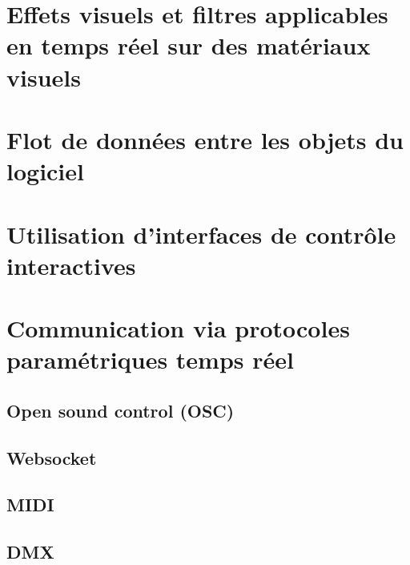 \documentclass[
]{book}
\begin{document}
\hypertarget{effets-visuels-et-filtres-applicables-en-temps-ruxe9el-sur-des-matuxe9riaux-visuels}{%
\section{Effets visuels et filtres applicables en temps réel sur des matériaux visuels}\label{effets-visuels-et-filtres-applicables-en-temps-ruxe9el-sur-des-matuxe9riaux-visuels}}

\hypertarget{flot-de-donnuxe9es-entre-les-objets-du-logiciel}{%
\section{Flot de données entre les objets du logiciel}\label{flot-de-donnuxe9es-entre-les-objets-du-logiciel}}

\hypertarget{interagir_interfaces}{%
\section{Utilisation d'interfaces de contrôle interactives}\label{interagir_interfaces}}

\hypertarget{interagir_protocoles}{%
\section{Communication via protocoles paramétriques temps réel}\label{interagir_protocoles}}

\hypertarget{protocole_osc}{%
\subsection{Open sound control (OSC)}\label{protocole_osc}}

\hypertarget{protocole_websocket}{%
\subsection{Websocket}\label{protocole_websocket}}

\hypertarget{protocole_midi}{%
\subsection{MIDI}\label{protocole_midi}}

\hypertarget{protocole_dmx}{%
\subsection{DMX}\label{protocole_dmx}}
\end{document}
